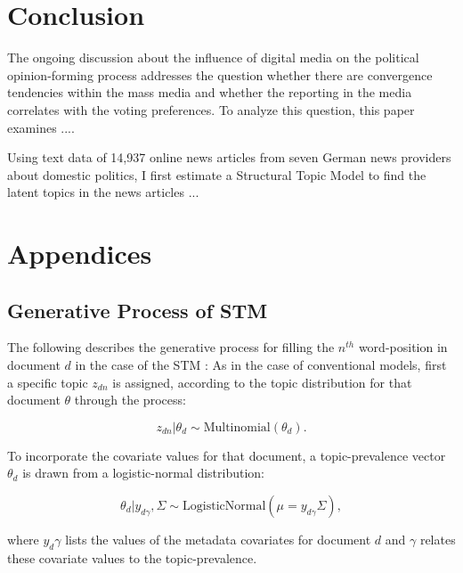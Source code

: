 \documentclass[12pt,a4paper,notitlepage]{article}
\begin{document}
\section{Conclusion}

The ongoing discussion about the influence of digital media on the political opinion-forming process addresses the question whether there are convergence tendencies within the mass media and whether the reporting in the media correlates with the voting preferences. To analyze this question, this paper examines .... 

Using text data of 14,937 online news articles from seven German news providers about domestic politics, I first estimate a Structural Topic Model to find the latent topics in the news articles ...

\pagebreak

\printbibliography

\appendix
\section{Appendices}

\subsection{Generative Process of STM}\label{a_generativeProcess}

 The following describes the generative process for filling the $n^{th}$ word-position in document $d$ in the case of the STM \citep{roberts_structural_2013}: As in the case of conventional models, first a specific topic $z_{dn}$ is assigned, according to the topic distribution for that document $\theta$ through the process:

\begin{equation}
	z_{dn}|\theta_d \sim \textrm{Multinomial}(\theta_d).
\end{equation}

To incorporate the covariate values for that document, a topic-prevalence vector $\theta_d$ is drawn from a logistic-normal distribution:

\begin{equation}
	\theta_d|y_{d\gamma},\Sigma \sim \textrm{LogisticNormal}(\mu = y_{d\gamma}\Sigma),
\end{equation}

where $y_d\gamma$ lists the values of the metadata covariates for document $d$ and $\gamma$ relates these covariate values to the topic-prevalence. 
\end{document}

